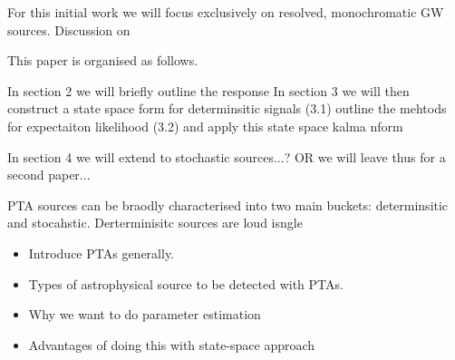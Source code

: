\documentclass[fleqn,usenatbib,useAMS]{mnras}
\begin{document}
For this initial work we will focus exclusively on resolved, monochromatic GW sources. Discussion on 





This paper is organised as follows.

In section 2 we will briefly outline the response 
In section 3 we will then construct a state space form for determinsitic signals (3.1) outline the mehtods for expectaiton likelihood (3.2) and apply this state space kalma nform 

In section 4 we will extend to stochastic sources...? OR we will leave thus for a second paper... 




PTA sources can be braodly characterised into two main buckets: determinsitic and stocahstic. Derterminisitc sources are loud isngle 










\begin{itemize}
	\item Introduce PTAs generally.
	\item Types of astrophysical source to be detected with PTAs.
	\item Why we want to do parameter estimation
	\item Advantages of doing this with state-space approach
\end{itemize}
\end{document}
